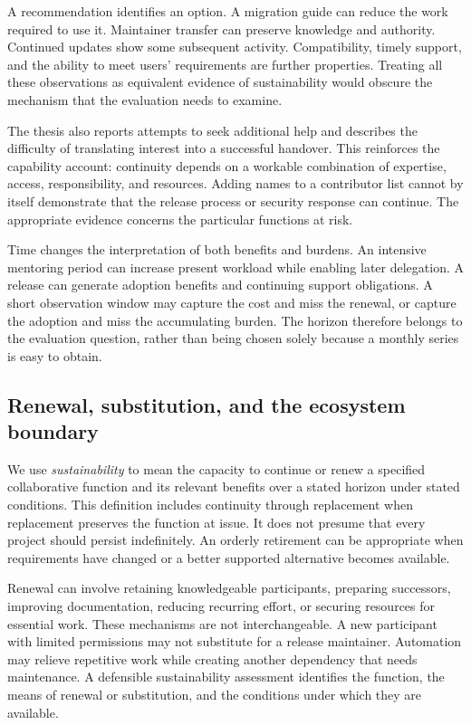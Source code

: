 A recommendation identifies an option. A migration guide can reduce the work required to use it. Maintainer transfer can preserve knowledge and authority. Continued updates show some subsequent activity. Compatibility, timely support, and the ability to meet users' requirements are further properties. Treating all these observations as equivalent evidence of sustainability would obscure the mechanism that the evaluation needs to examine.

The thesis also reports attempts to seek additional help and describes the difficulty of translating interest into a successful handover. This reinforces the capability account: continuity depends on a workable combination of expertise, access, responsibility, and resources. Adding names to a contributor list cannot by itself demonstrate that the release process or security response can continue. The appropriate evidence concerns the particular functions at risk.

Time changes the interpretation of both benefits and burdens. An intensive mentoring period can increase present workload while enabling later delegation. A release can generate adoption benefits and continuing support obligations. A short observation window may capture the cost and miss the renewal, or capture the adoption and miss the accumulating burden. The horizon therefore belongs to the evaluation question, rather than being chosen solely because a monthly series is easy to obtain.

\subsection{Renewal, substitution, and the ecosystem boundary}
We use \emph{sustainability} to mean the capacity to continue or renew a specified collaborative function and its relevant benefits over a stated horizon under stated conditions. This definition includes continuity through replacement when replacement preserves the function at issue. It does not presume that every project should persist indefinitely. An orderly retirement can be appropriate when requirements have changed or a better supported alternative becomes available.

Renewal can involve retaining knowledgeable participants, preparing successors, improving documentation, reducing recurring effort, or securing resources for essential work. These mechanisms are not interchangeable. A new participant with limited permissions may not substitute for a release maintainer. Automation may relieve repetitive work while creating another dependency that needs maintenance. A defensible sustainability assessment identifies the function, the means of renewal or substitution, and the conditions under which they are available.


